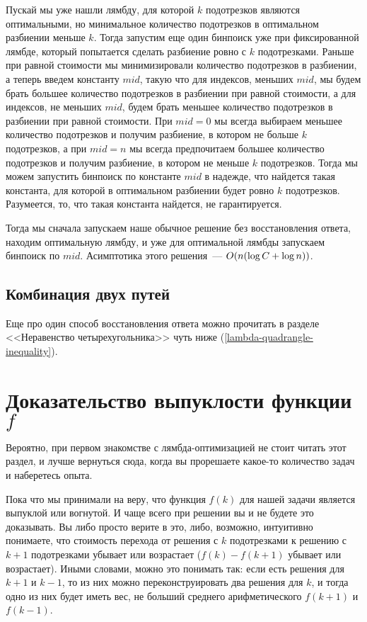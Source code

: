Пускай мы уже нашли лямбду, для которой $k$ подотрезков являются оптимальными, но минимальное количество подотрезков в оптимальном разбиении меньше $k$. Тогда запустим еще один бинпоиск уже при фиксированной лямбде, который попытается сделать разбиение ровно с $k$ подотрезками. Раньше при равной стоимости мы минимизировали количество подотрезков в разбиении, а теперь введем константу $mid$, такую что для индексов, меньших $mid$, мы будем брать большее количество подотрезков в разбиении при равной стоимости, а для индексов, не меньших $mid$, будем брать меньшее количество подотрезков в разбиении при равной стоимости. При $mid = 0$ мы всегда выбираем меньшее количество подотрезков и получим разбиение, в котором не больше $k$ подотрезков, а при $mid = n$ мы всегда предпочитаем большее количество подотрезков и получим разбиение, в котором не меньше $k$ подотрезков. Тогда мы можем запустить бинпоиск по константе $mid$ в надежде, что найдется такая константа, для которой в оптимальном разбиении будет ровно $k$ подотрезков. Разумеется, то, что такая константа найдется, не гарантируется.

Тогда мы сначала запускаем наше обычное решение без восстановления ответа, находим оптимальную лямбду, и уже для оптимальной лямбды запускаем бинпоиск по $mid$. Асимптотика этого решения~--- $O(n (\log C + \log n))$.

\subsection{Комбинация двух путей}

Еще про один способ восстановления ответа можно прочитать в разделе <<Неравенство четырехугольника>> чуть ниже (\ref{lambda-quadrangle-inequality}).

\section{Доказательство выпуклости функции $f$}

Вероятно, при первом знакомстве с лямбда-оптимизацией не стоит читать этот раздел, и лучше вернуться сюда, когда вы прорешаете какое-то количество задач и наберетесь опыта.

Пока что мы принимали на веру, что функция $f(k)$ для нашей задачи является выпуклой или вогнутой. И чаще всего при решении вы и не будете это доказывать. Вы либо просто верите в это, либо, возможно, интуитивно понимаете, что стоимость перехода от решения с $k$ подотрезками к решению с $k + 1$ подотрезками убывает или возрастает ($f(k) - f(k + 1)$ убывает или возрастает). Иными словами, можно это понимать так: если есть решения для $k + 1$ и $k - 1$, то из них можно переконструировать два решения для $k$, и тогда одно из них будет иметь вес, не больший среднего арифметического $f(k + 1)$ и $f(k - 1)$.

